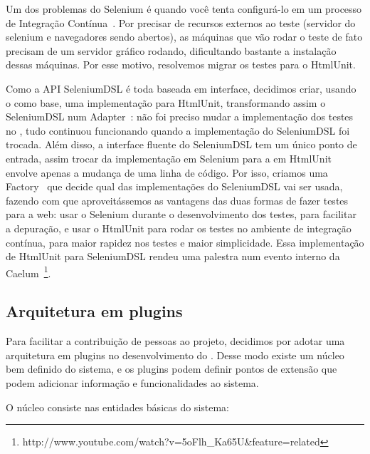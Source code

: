 Um dos problemas do Selenium é quando você tenta configurá-lo em um processo de Integração Contínua~\cite{ci}. Por precisar de recursos externos ao teste (servidor do selenium e navegadores sendo abertos), as máquinas que vão rodar o teste de fato precisam de um servidor gráfico rodando, dificultando bastante a instalação dessas máquinas. Por esse motivo, resolvemos migrar os testes para o HtmlUnit.

Como a API SeleniumDSL é toda baseada em interface, decidimos criar, usando o \calopsita como base, uma implementação para HtmlUnit, transformando assim o SeleniumDSL num Adapter~\cite{gof}: não foi preciso mudar a implementação dos testes no \calopsita, tudo continuou funcionando quando a implementação do SeleniumDSL foi trocada. Além disso, a interface fluente do SeleniumDSL tem um único ponto de entrada, assim trocar da implementação em Selenium para a em HtmlUnit envolve apenas a mudança de uma linha de código. Por isso, criamos uma Factory~\cite{gof} que decide qual das implementações do SeleniumDSL vai ser usada, fazendo com que aproveitássemos as vantagens das duas formas de fazer testes para a web: usar o Selenium durante o desenvolvimento dos testes, para facilitar a depuração, e usar o HtmlUnit para rodar os testes no ambiente de integração contínua, para maior rapidez nos testes e maior simplicidade. Essa implementação de HtmlUnit para SeleniumDSL rendeu uma palestra num evento interno da Caelum~\footnote{http://www.youtube.com/watch?v=5oFlh\_Ka65U\&feature=related}.

\subsection{Arquitetura em plugins}

Para facilitar a contribuição de pessoas ao projeto, decidimos por adotar uma arquitetura em plugins no desenvolvimento do \calopsita. Desse modo existe um núcleo bem definido do sistema, e os plugins podem definir pontos de extensão que podem adicionar informação e funcionalidades ao sistema.

O núcleo consiste nas entidades básicas do sistema:


